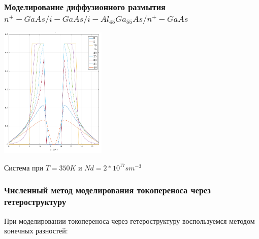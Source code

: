\documentclass[10pt,pdf,hyperref={unicode},aspectratio={169}]{beamer}
\begin{document}
\begin{frame}
	\frametitle{Моделирование диффузионного размытия $n^{+}\!-\!GaAs/i\!-\!GaAs/i\!-\!Al_{45}Ga_{55}As/ n^{+}\!-\!GaAs$}
		\begin{center}
			\includegraphics[width=0.38\textwidth]{assets/D1AlGaAs_Si}

			Система при $T = 350K$ и $Nd = 2*10^{17} sm^{-3}$
		\end{center}
\end{frame}

\begin{frame}
	\frametitle{Численный метод моделирования токопереноса через гетероструктуру}
	При моделировании токопереноса через гетероструктуру воспользуемся методом конечных разностей:
\end{frame}
\end{document}

